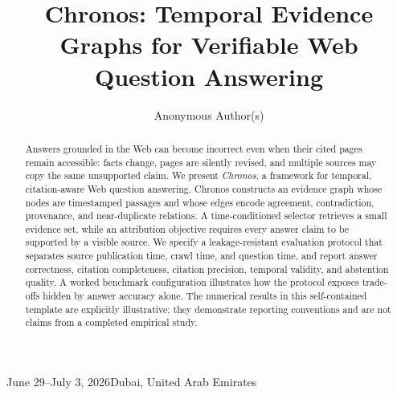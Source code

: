 %
%


\usepackage{amsmath}
\usepackage{booktabs}
\usepackage{array}

\renewcommand\footnotetextcopyrightpermission[1]{}

  {June 29--July 3, 2026}{Dubai, United Arab Emirates}
\acmDOI{}
\acmISBN{}

\title[Chronos]{Chronos: Temporal Evidence Graphs for Verifiable Web
  Question Answering}

\author{Anonymous Author(s)}

\begin{abstract}
Answers grounded in the Web can become incorrect even when their cited pages
remain accessible: facts change, pages are silently revised, and multiple
sources may copy the same unsupported claim.  We present \emph{Chronos}, a
framework for temporal, citation-aware Web question answering.  Chronos
constructs an evidence graph whose nodes are timestamped passages and whose
edges encode agreement, contradiction, provenance, and near-duplicate
relations.  A time-conditioned selector retrieves a small evidence set, while
an attribution objective requires every answer claim to be supported by a
visible source.  We specify a leakage-resistant evaluation protocol that
separates source publication time, crawl time, and question time, and report
answer correctness, citation completeness, citation precision, temporal
validity, and abstention quality.  A worked benchmark configuration illustrates
how the protocol exposes trade-offs hidden by answer accuracy alone.  The
numerical results in this self-contained template are explicitly illustrative;
they demonstrate reporting conventions and are not claims from a completed
empirical study.
\end{abstract}

